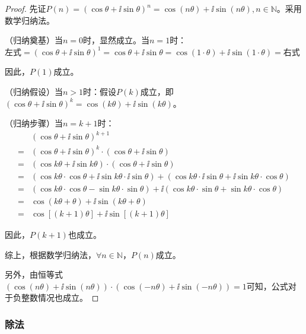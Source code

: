\documentclass[a4paper,openany]{ctexbook}
\begin{document}
\begin{proof}
    先证\(P ( n ) = ( \cos \theta + \ii \sin \theta )^n =\cos (n \theta) + \ii \sin (n \theta) , n \in\mathbb{N}\)。采用数学归纳法。

    （归纳奠基）当\(n=0\)时，显然成立。当\(n=1\)时：\\
    左式\( = ( \cos \theta + \ii \sin \theta )^1 =  \cos \theta + \ii \sin \theta  = \cos (1 \cdot \theta) + \ii \sin (1 \cdot \theta) =  \)右式

    因此，\(P(1)\)成立。

    （归纳假设）当\(n>1\)时：假设\(P(k)\)成立，即\((\cos\theta + \ii\sin\theta)^k = \cos (k\theta) + \ii\sin(k\theta)\)。

    （归纳步骤）当\(n=k+1\)时：
    \begin{align*}
          & (\cos\theta + \ii\sin\theta)^{k+1}                                                                                                              \\
        = & (\cos\theta + \ii\sin\theta)^{k} \cdot (\cos\theta + \ii\sin\theta)                                                                             \\
        = & (\cos k\theta + \ii\sin k\theta)  \cdot (\cos\theta + \ii\sin\theta)                                                                            \\
        = & (\cos k\theta  \cdot \cos\theta + \ii\sin k\theta  \cdot \ii\sin\theta) + (\cos k\theta  \cdot \ii\sin\theta+\ii\sin k\theta  \cdot \cos\theta) \\
        = & (\cos k\theta  \cdot \cos\theta - \sin k\theta  \cdot \sin\theta) + \ii(\cos k\theta  \cdot \sin\theta + \sin k \theta  \cdot \cos\theta)       \\
        = & \cos (k\theta+\theta) + \ii\sin (k\theta+\theta)                                                                                                \\
        = & \cos [(k+1)\theta] + \ii\sin [(k+1)\theta]
    \end{align*}

    因此，\(P(k+1)\)也成立。

    综上，根据数学归纳法，\(\forall n \in \mathbb{N}\)，\(P(n)\)成立。

    另外，由恒等式\( (\cos (n \theta)+\ii \sin (n \theta)) \cdot (\cos (-n \theta)+\ii \sin (-n \theta)) =1 \)可知，公式对于负整数情况也成立。
\end{proof}

\subsubsection{除法}
\end{document}
